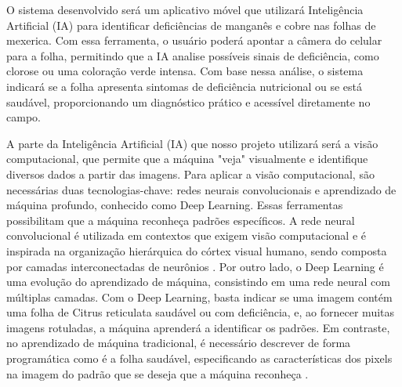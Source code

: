 O sistema desenvolvido será um aplicativo móvel que utilizará Inteligência Artificial (IA) para identificar deficiências de manganês e cobre nas folhas de mexerica. Com essa ferramenta, o usuário poderá apontar a câmera do celular para a folha, permitindo que a IA analise possíveis sinais de deficiência, como clorose ou uma coloração verde intensa. Com base nessa análise, o sistema indicará se a folha apresenta sintomas de deficiência nutricional ou se está saudável, proporcionando um diagnóstico prático e acessível diretamente no campo.

A parte da Inteligência Artificial (IA) que nosso projeto utilizará será a visão computacional, que permite que a máquina "veja" visualmente e identifique diversos dados a partir das imagens. Para aplicar a visão computacional, são necessárias duas tecnologias-chave: redes neurais convolucionais e aprendizado de máquina profundo, conhecido como Deep Learning. Essas ferramentas possibilitam que a máquina reconheça padrões específicos. A rede neural convolucional é utilizada em contextos que exigem visão computacional e é inspirada na organização hierárquica do córtex visual humano, sendo composta por camadas interconectadas de neurônios \cite{IntroduçãoRedeNeural}. Por outro lado, o Deep Learning é uma evolução do aprendizado de máquina, consistindo em uma rede neural com múltiplas camadas. Com o Deep Learning, basta indicar se uma imagem contém uma folha de Citrus reticulata saudável ou com deficiência, e, ao fornecer muitas imagens rotuladas, a máquina aprenderá a identificar os padrões. Em contraste, no aprendizado de máquina tradicional, é necessário descrever de forma programática como é a folha saudável, especificando as características dos pixels na imagem do padrão que se deseja que a máquina reconheça \cite{IntroduçãoDeepLearning}.